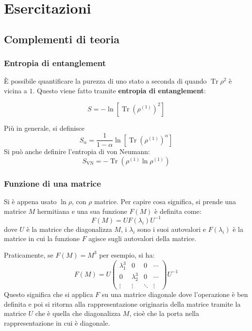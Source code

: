 \documentclass[11pt, a4paper]{scrartcl} %
\numberwithin{equation}{subsection}
\theoremstyle{style2}
\theoremstyle{style1}
\newenvironment{boxenv}[1][]{
    \begin{eqbox}[#1]
    }{
   \end{eqbox}
}
\begin{document}
\newpage
\section{Esercitazioni}
\subsection{Complementi di teoria}

\subsubsection{Entropia di entanglement}

\`E possibile quantificare la purezza di uno stato a seconda di quando $\operatorname{Tr} \rho ^2$ \`e vicina a $1$. 
Questo viene fatto tramite \textbf{entropia di entanglement}:
\begin{boxenv}[]
\begin{equation}
	S = - \ln \left[ \operatorname{Tr} \left(\rho ^{(1)} \right) ^2 \right] 
\end{equation}
\end{boxenv}
Pi\`u in generale, si definisce 
\begin{equation}
	S_\alpha = \frac{1}{1-\alpha } \ln \left[ \operatorname{Tr} \left(\rho^{(1)}  \right) ^\alpha  \right] 
\end{equation}
Si pu\`o anche definire l'entropia di von Neumann:
\begin{equation}
	S_\text{VN} = - \operatorname{Tr} \left(\rho ^{(1)} \ln\rho ^{(1)} \right) 
\end{equation}
\subsubsection{Funzione di una matrice}
Si \`e appena usato $\ln \rho $, con $\rho $ matrice. 
Per capire cosa significa, si prende una matrice $M$ hermitiana e una sua funzione $F(M)$ \`e definita come:
\begin{equation}
	F(M) = U F(\lambda _i) U^{-1} 
\end{equation}
dove $U$ \`e la matrice che diagonalizza $M$, i $\lambda _i$ sono i suoi autovalori e $F(\lambda _i)$ \`e la matrice in cui la funzione $F$ agisce sugli autovalori della matrice.

Praticamente, se $F(M) = M ^3$ per esempio, si ha:
\[
	F(M) = U \begin{pmatrix} \lambda _1^3 & 0 &0 & \cdots \\ 0& \lambda _2 ^3 & 0 &\cdots \\ \vdots & \vdots & \ddots & \vdots\end{pmatrix} U^{-1} 
\] 
Questo significa che si applica $F$ su una matrice diagonale dove l'operazione \`e ben definita e poi si ritorna alla rappresentazione originaria della matrice tramite la matrice $U$ che \`e quella che diagonalizza $M$, cio\`e che la porta nella rappresentazione in cui \`e diagonale.
\end{document}
